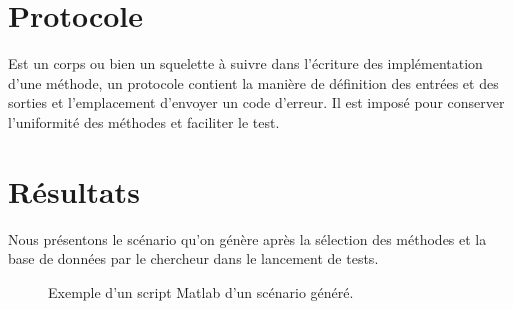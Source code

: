 \section{Protocole}
\label{protocol}
Est un corps ou bien un squelette à suivre dans l’écriture des implémentation d’une méthode, un protocole contient la manière de définition des entrées et des sorties et l’emplacement d’envoyer un code d’erreur. Il est imposé pour conserver l’uniformité des méthodes et faciliter le test.
\section{Résultats}
Nous présentons le scénario qu'on génère après la sélection des méthodes et la base de données par le chercheur dans le lancement de tests. 
\begin{figure}[H]
	\centering
	\caption{Exemple d’un script Matlab d'un scénario généré.}
	\label{fig:senario}
\end{figure}


